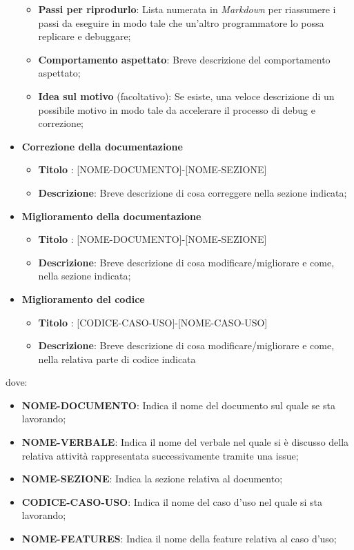 \begin{itemize}
\begin{itemize}
                \item \textbf{Passi per riprodurlo}: Lista numerata in \textit{Markdown} per riassumere i passi da eseguire in modo tale che un'altro programmatore lo possa replicare e debuggare;
                \item \textbf{Comportamento aspettato}: Breve descrizione del comportamento aspettato;
                \item \textbf{Idea sul motivo} (facoltativo): Se esiste, una veloce descrizione di un possibile motivo in modo tale da accelerare il processo di debug e correzione;
            \end{itemize}
            \item  \textbf{Correzione della documentazione}
            \begin{itemize}
                \item \textbf{Titolo} : [NOME-DOCUMENTO]-[NOME-SEZIONE]
                \item \textbf{Descrizione}: Breve descrizione di cosa correggere nella sezione indicata;
            \end{itemize}
            \item  \textbf{Miglioramento della documentazione}
            \begin{itemize}
                \item \textbf{Titolo} : [NOME-DOCUMENTO]-[NOME-SEZIONE]
                \item \textbf{Descrizione}: Breve descrizione di cosa modificare/migliorare e come, nella sezione indicata;
            \end{itemize}
            \item  \textbf{Miglioramento del codice}
            \begin{itemize}
                 \item \textbf{Titolo} : [CODICE-CASO-USO]-[NOME-CASO-USO]
                 \item \textbf{Descrizione}: Breve descrizione di cosa modificare/migliorare e come, nella relativa parte di codice indicata
            \end{itemize}
        \end{itemize}
        dove:

        \begin{itemize}
            \item \textbf{NOME-DOCUMENTO}: Indica il nome del documento sul quale se sta lavorando;
            \item \textbf{NOME-VERBALE}: Indica il nome del verbale nel quale si è discusso della relativa attività rappresentata successivamente tramite una issue;
            \item \textbf{NOME-SEZIONE}: Indica la sezione relativa al documento;
            \item \textbf{CODICE-CASO-USO}: Indica il nome del caso d'uso nel quale si sta lavorando;
            \item \textbf{NOME-FEATURES}: Indica il nome della feature relativa al caso d'uso;
        \end{itemize}



